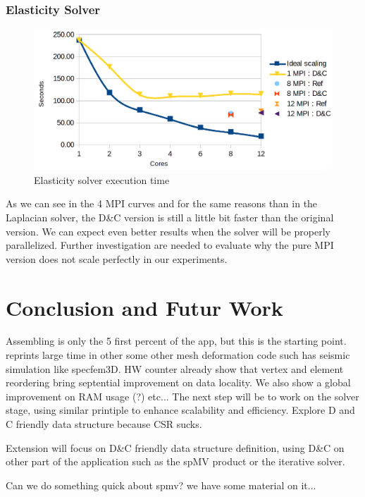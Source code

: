 \documentclass{IOS-Book-Article}
\begin{document}
\subsubsection{Elasticity Solver}
\begin{figure}[htp]
 \centering
 \label{fig9}
 \includegraphics[scale=0.2]{Elasticity_solver_time.png}
 \caption{Elasticity solver execution time}
\end{figure}
As we can see in the 4 MPI curves and for the same reasons than in the Laplacian solver, the D\&C version is still a little bit faster than the original version.
We can expect even better results when the solver will be properly parallelized.
Further investigation are needed to evaluate why the pure MPI version does not scale perfectly in our experiments.

\section{Conclusion and Futur Work}
Assembling is only the 5 first percent of the app, but this is the starting point. reprints large time in other some other mesh deformation code such has seismic
simulation like specfem3D.
HW counter already show that vertex and element reordering bring septential improvement on data locality. We also show a global improvement on RAM usage (?) etc...
The next step will be to work on the solver stage, using similar printiple to enhance scalability and efficiency. Explore D and C friendly data structure because CSR sucks.  

Extension will focus on D\&C friendly data structure definition, using D\&C on other part of the  application such as the spMV product or the iterative solver. 

Can we do something quick about spmv? we have some material on it...



\end{document}

